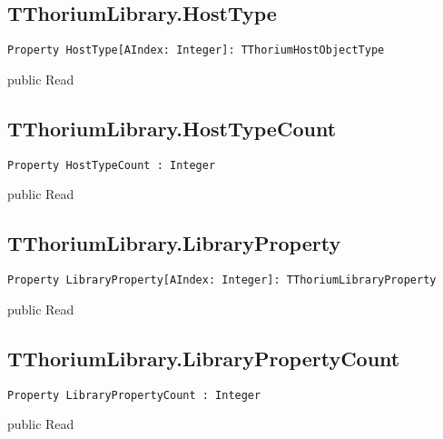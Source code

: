 \subsection{TThoriumLibrary.HostType}
\label{thoriumcore:thorium:tthoriumlibrary:hosttype}
\begin{FPCList}
\Synopsis
\Declaration 

\begin{verbatim}
Property HostType[AIndex: Integer]: TThoriumHostObjectType
\end{verbatim}
\Visibility
public
\Access
Read
\Description
\end{FPCList}
\subsection{TThoriumLibrary.HostTypeCount}
\label{thoriumcore:thorium:tthoriumlibrary:hosttypecount}
\begin{FPCList}
\Synopsis
\Declaration 

\begin{verbatim}
Property HostTypeCount : Integer
\end{verbatim}
\Visibility
public
\Access
Read
\Description
\end{FPCList}
\subsection{TThoriumLibrary.LibraryProperty}
\label{thoriumcore:thorium:tthoriumlibrary:libraryproperty}
\begin{FPCList}
\Synopsis
\Declaration 

\begin{verbatim}
Property LibraryProperty[AIndex: Integer]: TThoriumLibraryProperty
\end{verbatim}
\Visibility
public
\Access
Read
\Description
\end{FPCList}
\subsection{TThoriumLibrary.LibraryPropertyCount}
\label{thoriumcore:thorium:tthoriumlibrary:librarypropertycount}
\begin{FPCList}
\Synopsis
\Declaration 

\begin{verbatim}
Property LibraryPropertyCount : Integer
\end{verbatim}
\Visibility
public
\Access
Read
\Description
\end{FPCList}
